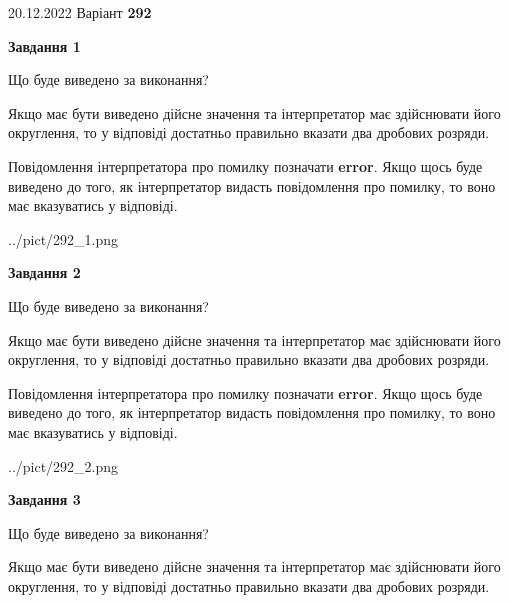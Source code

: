 \documentclass[12pt, ukrainian]{article}
\begin{document}
{20.12.2022 Варіант \No \textbf { 292 }\par}
{
\begin {Large}

{\begin {center}\textbf{Завдання 1}\end {center}}\par
Що буде виведено за виконання? \par

Якщо має бути виведено дійсне значення та інтерпретатор має здійснювати його округлення, 
то у відповіді достатньо правильно вказати два дробових розряди.

Повідомлення інтерпретатора про помилку позначати \textbf{error}.
Якщо щось буде виведено до того, як інтерпретатор видасть повідомлення про помилку, 
то воно має вказуватись у відповіді. \par

\begin{center}
	{../pict/292_1.png}
\end{center}
\newpage

{\begin {center}\textbf{Завдання 2}\end {center}}\par
Що буде виведено за виконання? \par

Якщо має бути виведено дійсне значення та інтерпретатор має здійснювати його округлення, 
то у відповіді достатньо правильно вказати два дробових розряди.

Повідомлення інтерпретатора про помилку позначати \textbf{error}.
Якщо щось буде виведено до того, як інтерпретатор видасть повідомлення про помилку, 
то воно має вказуватись у відповіді. \par

\begin{center}
	{../pict/292_2.png}
\end{center}
\newpage

{\begin {center}\textbf{Завдання 3}\end {center}}\par
Що буде виведено за виконання? \par

Якщо має бути виведено дійсне значення та інтерпретатор має здійснювати його округлення, 
то у відповіді достатньо правильно вказати два дробових розряди.


\end{Large}}
\end{document}
